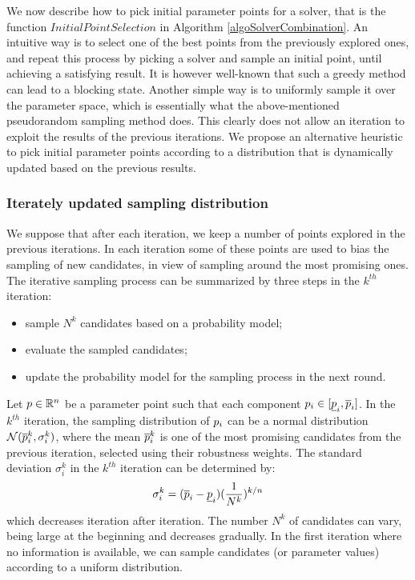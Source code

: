 We now describe how to pick initial parameter points for a solver, that is the function $InitialPointSelection$ in Algorithm \ref{algoSolverCombination}. An intuitive way is to select one of the best points from the previously explored ones, and repeat this process by picking a solver and sample an initial point, until achieving a satisfying result. It is however well-known that such a greedy method can lead to a blocking state. Another simple way is to uniformly sample it over the parameter space, which is essentially what the above-mentioned pseudorandom sampling method does. This clearly does not allow an iteration to exploit the results of the previous iterations. We propose an alternative heuristic to pick initial parameter points according to a distribution that is dynamically updated based on the previous results.

\subsubsection*{Iterately updated sampling distribution}
We suppose that after each iteration, we keep a number of points explored in the previous iterations. In each iteration some of these points are used to bias the sampling of new candidates, in view of sampling around the most promising ones. The iterative sampling process can be summarized by three steps in the $k^{th}$ iteration: 
\begin{itemize}
\item sample $N^k$ candidates based on a probability model; 
\item evaluate the sampled candidates; 
\item update the probability model for the sampling process in the next round.
\end{itemize}
Let $p \in \mathbb{R}^n$ be a parameter point such that each component $p_i \in [\underline{p}_i, \overline{p}_i]$. In the $k^{th}$ iteration, the sampling distribution of $p_i$ can be a normal distribution $\mathcal{N}(\overline{p}^k_i, \sigma_i^k)$, where the mean $\overline{p}^k_i$ is one of the most promising candidates from the previous iteration, selected using their robustness weights. The standard deviation $\sigma_i^k$ in the $k^{th}$ iteration can be determined by: 
\begin{equation} \label{eq:sigma}
\sigma_i^k = (\overline{p}_i - \underline{p}_i) (\frac{1}{N^k})^{k/n}
\end{equation}
which decreases iteration after iteration. The number $N^k$ of candidates can vary, being large at the beginning and decreases gradually. In the first iteration where no information is available, we can sample candidates (or parameter values) according to a uniform distribution. 

